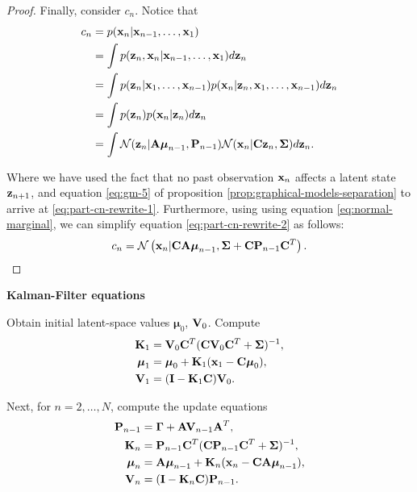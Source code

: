 \documentclass[11pt]{article}
\numberwithin{equation}{section}
\newcommand{\x}{{\bf x}}
\newcommand{\z}{{\bf z}}
\newcommand{\N}{\mathcal{N}}
\begin{document}
\begin{proof}
	Finally, consider $c_n$. Notice that
	\begin{align}
		c_n &= p(\x_n \vert \x_{n-1}, \ldots, \x_1)\\
			&= \int p(\z_n, \x_n \vert \x_{n-1}, \ldots, \x_1) d\z_n\\
			&= \int p(\z_n \vert \x_1, \ldots, \x_{n-1}) p (\x_n \vert \z_n, \x_1, \ldots, \x_{n-1}) d\z_n \\
			&= \int p(\z_n) p (\x_n \vert \z_n) d\z_n \label{eq:part-cn-rewrite-1} \\
			&= \int \N(\z_n\vert {\bf A} \boldsymbol\mu_{n-1}, {\bf P}_{n-1}) \N(\x_n \vert {\bf C}\z_n, \boldsymbol\Sigma) d\z_n. \label{eq:part-cn-rewrite-2}
	\end{align}
	
	Where we have used the fact that no past observation $\x_n$ affects a latent state $\z_{n+1}$, and equation \eqref{eq:gm-5} of proposition \ref{prop:graphical-models-separation} to arrive at \eqref{eq:part-cn-rewrite-1}. Furthermore, using using equation \eqref{eq:normal-marginal}, we can  simplify equation \eqref{eq:part-cn-rewrite-2} as follows:
	\begin{equation}
		c_n = \N\left(\x_n \vert {\bf C}{\bf A}\boldsymbol\mu_{n-1}, \boldsymbol\Sigma + {\bf C}{\bf P}_{n-1}{\bf C}^T\right).
	\end{equation}	
\end{proof}


\begin{tcolorbox}
\textbf{Kalman-Filter equations}

	Obtain initial latent-space values $\boldsymbol{\mu}_0$, ${\bf V}_0$. Compute
	\begin{align}
		{\bf K}_1 &= {\bf V}_0{\bf C}^T({\bf C} {\bf V}_0 {\bf C}^T + \boldsymbol\Sigma)^{-1},\\
		\boldsymbol{\mu}_1 &= \boldsymbol{\mu}_0 + {\bf K}_1(\x_1 -{\bf C}\boldsymbol\mu_0),\\
		{\bf V}_1 &=  ({\bf I} - {\bf K}_1{\bf C}){\bf V}_0.
	\end{align}

	Next, for $n=2, \ldots, N$, compute the update equations
	\begin{align}
		{\bf P}_{n-1} &= \boldsymbol{\Gamma} + {\bf A}{\bf V}_{n-1}{\bf A}^T,\\
		{\bf K}_n &= {\bf P}_{n-1}{\bf C}^T({\bf C} {\bf P}_{n-1}{\bf C}^T + \boldsymbol\Sigma)^{-1},\\
		\boldsymbol{\mu}_n &= {\bf A}\boldsymbol{\mu}_{n-1} + {\bf K}_n(\x_n -{\bf C}{\bf A}\boldsymbol\mu_{n-1}),\\
		{\bf V}_n &=  ({\bf I} - {\bf K}_n{\bf C}){\bf P}_{n-1}.
	\end{align}
\end{tcolorbox}
\end{document}
